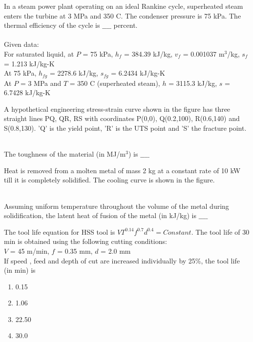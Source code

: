 \item In a steam power plant operating on an ideal Rankine cycle, superheated steam enters the turbine at 3 MPa and 350 \degree C. The condenser pressure is 75 kPa. The thermal efficiency of the cycle is $\_\_\_\_$ percent. \\\\
Given data: \\
For saturated liquid, at $P$ = 75 kPa, $h_f$ = 384.39 kJ/kg, $v_f$ = 0.001037 $\text{m}^3$/kg, $s_f$ = 1.213 kJ/kg-K \\
At 75 kPa, $h_{fg}$ = 2278.6 kJ/kg, $s_{fg}$ = 6.2434 kJ/kg-K \\
At $P$ = 3 MPa and $T$ = 350 \degree C (superheated steam), $h$ = 3115.3 kJ/kg,
$s$ = 6.7428 kJ/kg-K \\
\item A hypothetical engineering stress-strain curve shown in the figure has three straight lines PQ, QR, RS with coordinates P(0,0), Q(0.2,100), R(0.6,140) and S(0.8,130). 'Q' is the yield point, 'R' is the UTS point and 'S' the fracture point. 
\begin{figure}[!ht]
\centering
\resizebox{0.5\textwidth}{!}{%

}%
\end{figure} \\
The toughness of the material (in MJ/$\text{m}^3$) is $\_\_\_\_$ \\
\item Heat is removed from a molten metal of mass 2 kg at a constant rate of 10 kW till it is completely solidified. The cooling curve is shown in the figure.
\begin{figure}[!ht]
\centering
\resizebox{0.5\textwidth}{!}{%

}%
\end{figure} \\
Assuming uniform temperature throughout the volume of the metal during solidification, the latent heat of fusion of the metal (in kJ/kg) is $\_\_\_\_$ \\
\item The tool life equation for HSS tool is $VT^{0.14}f^{0.7}d^{0.4} = Constant$. The tool life  of 30 min is obtained using the following cutting conditions: \\
$V$ = 45 m/min, $f$ = 0.35 mm, $d$ = 2.0 mm \\
If speed , feed  and depth of cut  are increased individually by 25\%, the tool life (in min) is
\begin{enumerate}
    \item 0.15
    \item 1.06
    \item 22.50
    \item 30.0 \\
\end{enumerate}
